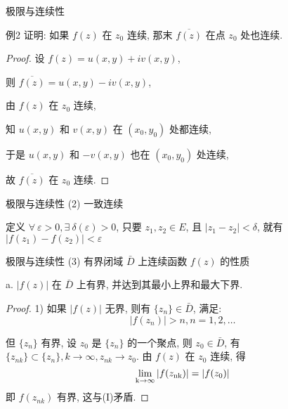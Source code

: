 \documentclass{beamer}
\begin{document}
\begin{frame}{极限与连续性}
\begin{block}{例2}
证明: 如果 $ f(z) $ 在 $ {z_0} $ 连续, 那末 $ \overline {f(z)} $ 在点 $ {z_0} $ 处也连续.

\begin{proof}
设 $ f(z) = u(x, y) + iv(x, y) $,  

则 $ \overline {f(z)} = u(x, y) - iv(x, y) $, 

由 $ f(z) $ 在 $ {z_0} $ 连续, 

知 $ u(x, y) $ 和 $ v(x, y) $ 在 $ ({x_0}, {y_0}) $ 处都连续, 

于是 $ u(x, y) $ 和 $ - v(x, y) $ 也在 $ ({x_0}, {y_0}) $ 处连续, 

故 $ \overline {f(z)} $ 在 $ {z_0} $ 连续.
\end{proof}
\end{block}
\end{frame}

\begin{frame}{极限与连续性}
(2) 一致连续

\begin{block}{定义}
 $ \forall\: \varepsilon >0, \exists\: \delta(\varepsilon) >0  $,  只要 $ z_1, z_2 \in E $, 且 $ |z_1- z_2|<\delta $, 就有 $ | f(z_1)- f(z_2) |< \varepsilon $ 
\end{block}



\end{frame}


\begin{frame}{极限与连续性}
(3) 有界闭域 $ \bar{D} $ 上连续函数 $ f(z) $ 的性质

a. $ |f(z)| $ 在 $ \bar{D} $ 上有界, 并达到其最小上界和最大下界. 

\begin{proof}
	1) 如果 $ |f(z)| $ 无界, 则有 $ \{z_n\}\in \bar{D} $, 满足: 
	\begin{equation}\label{key}
	|f(z_n)|>n, n=1, 2, \dots
	\end{equation}
	
	但 $ \{z_n\} $ 有界, 设 $ z_0 $ 是 $ \{z_n\} $ 的一个聚点, 则 $ z_0 \in \bar{D} $, 有 $ \{z_{nk}\} \subset \{z_n\}, k \to \infty, z_{nk} \to z_0 $. 由 $ f(z) $ 在 $ z_0 $ 连续, 得
	\[\lim\limits_{{\rm{k}} \to \infty } |f ( {z_{{\rm{nk}}}} ) | = |f ( {z_0} ) |\]
	即 $ f(z_{nk}) $ 有界, 这与(I)矛盾. 
\end{proof}
\end{frame}
\end{document}
